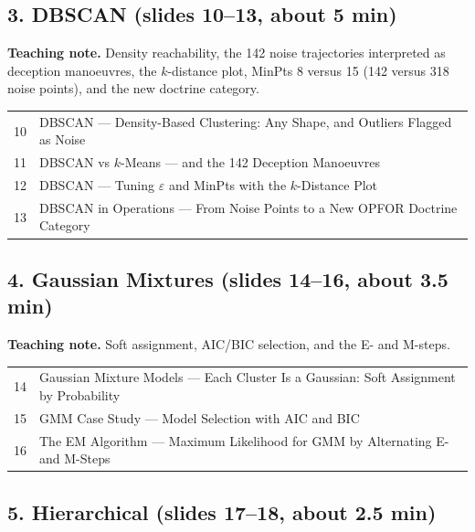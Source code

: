 \documentclass[11pt]{article}
\begin{document}
\subsection{3. DBSCAN \normalfont\small\color{GreyN}(slides 10--13, about 5 min)}

\textbf{Teaching note.} Density reachability, the 142 noise trajectories interpreted as deception manoeuvres, the $k$-distance plot, MinPts 8 versus 15 (142 versus 318 noise points), and the new doctrine category.

\begin{center}\small\renewcommand{\arraystretch}{1.1}\begin{tabularx}{\textwidth}{@{}r X@{}}10 & DBSCAN --- Density-Based Clustering: Any Shape, and Outliers Flagged as Noise\\
11 & DBSCAN vs $k$-Means --- and the 142 Deception Manoeuvres\\
12 & DBSCAN --- Tuning $\varepsilon$ and MinPts with the $k$-Distance Plot\\
13 & DBSCAN in Operations --- From Noise Points to a New OPFOR Doctrine Category\\\end{tabularx}\end{center}

\subsection{4. Gaussian Mixtures \normalfont\small\color{GreyN}(slides 14--16, about 3.5 min)}

\textbf{Teaching note.} Soft assignment, AIC/BIC selection, and the E- and M-steps.

\begin{center}\small\renewcommand{\arraystretch}{1.1}\begin{tabularx}{\textwidth}{@{}r X@{}}14 & Gaussian Mixture Models --- Each Cluster Is a Gaussian: Soft Assignment by Probability\\
15 & GMM Case Study --- Model Selection with AIC and BIC\\
16 & The EM Algorithm --- Maximum Likelihood for GMM by Alternating E- and M-Steps\\\end{tabularx}\end{center}

\subsection{5. Hierarchical \normalfont\small\color{GreyN}(slides 17--18, about 2.5 min)}
\end{document}
